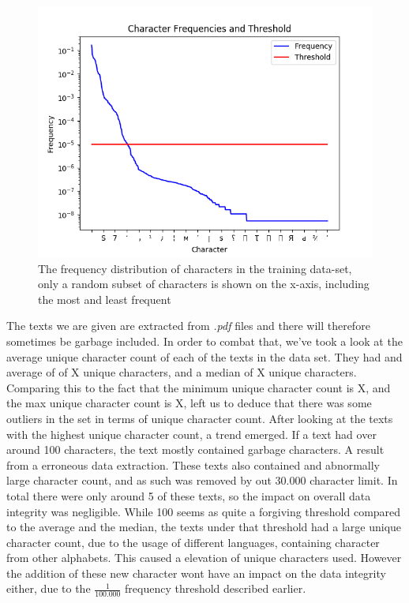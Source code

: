 \begin{figure}[htb]
    \centering
    \includegraphics[scale=.8]{./pictures/data/character_frequencies.png}
    \caption{The frequency distribution of characters in the training data-set,
        only a random subset of characters is shown on the x-axis, including the
        most and least frequent}
    \label{fig:character_frequencies}
\end{figure}

The texts we are given are extracted from \textit{.pdf} files and there will
therefore sometimes be garbage included. In order to combat that, we've took
a look at the average unique character count of each of the texts in the data
set. They had and average of of X unique characters, and a median of X unique
characters. Comparing this to the fact that the minimum unique character count
is X, and the max unique character count is X, left us to deduce that there was
some outliers in the set in terms of unique character count. After looking at
the texts with the highest unique character count, a trend emerged. If a text
had over around 100 characters, the text mostly contained garbage characters.
A result from a erroneous data extraction. These texts also contained and
abnormally large character count, and as such was removed by out 30.000
character limit. In total there were only around 5 of these texts, so the impact
on overall data integrity was negligible. While 100 seems as quite a forgiving
threshold compared to the average and the median, the texts under that threshold
had a large unique character count, due to the usage of different languages,
containing character from other alphabets. This caused a elevation of unique
characters used. However the addition of these new character wont have an impact
on the data integrity either, due to the $\frac{1}{100.000}$ frequency threshold
described earlier.

